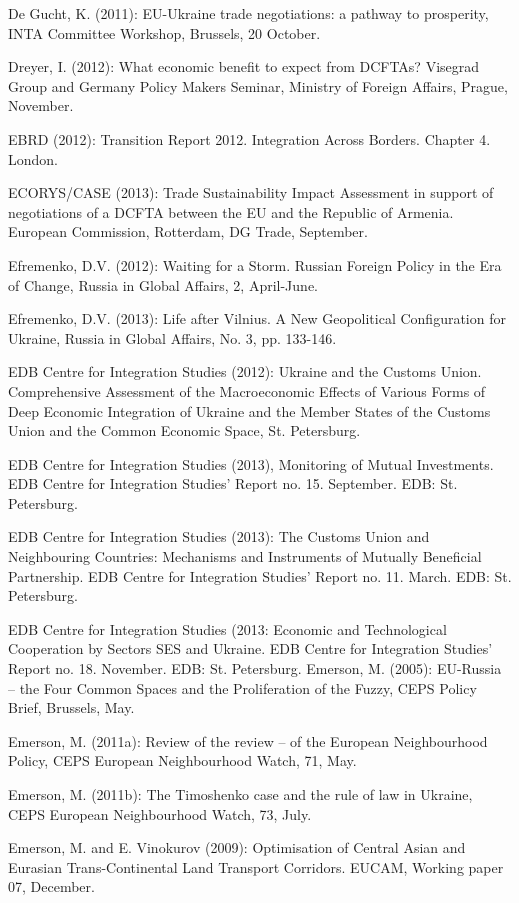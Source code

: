 De Gucht, K. (2011): EU-Ukraine trade negotiations: a pathway to prosperity, INTA Committee Workshop, Brussels, 20 October.

Dreyer, I. (2012): What economic benefit to expect from DCFTAs? Visegrad Group and Germany Policy Makers Seminar, Ministry of Foreign Affairs, Prague, November.

EBRD (2012): Transition Report 2012. Integration Across Borders. Chapter 4. London.

ECORYS/CASE (2013): Trade Sustainability Impact Assessment in support of negotiations of a DCFTA between the EU and the Republic of Armenia. European Commission, Rotterdam, DG Trade, September.

Efremenko, D.V. (2012): Waiting for a Storm. Russian Foreign Policy in the Era of Change, Russia in Global Affairs, 2, April-June.

Efremenko, D.V. (2013): Life after Vilnius. A New Geopolitical Configuration for Ukraine, Russia in Global Affairs, No. 3, pp. 133-146. 

EDB Centre for Integration Studies (2012): Ukraine and the Customs Union. Comprehensive Assessment of the Macroeconomic Effects of Various Forms of Deep Economic Integration of Ukraine and the Member States of the Customs Union and the Common Economic Space, St. Petersburg. 

EDB Centre for Integration Studies (2013), Monitoring of Mutual Investments. EDB Centre for Integration Studies' Report no. 15. September. EDB: St. Petersburg.

EDB Centre for Integration Studies (2013): The Customs Union and Neighbouring Countries: Mechanisms and Instruments of Mutually Beneficial Partnership. EDB Centre for Integration Studies' Report no. 11. March. EDB: St. Petersburg.

EDB Centre for Integration Studies (2013: Economic and Technological Cooperation by Sectors SES and Ukraine. EDB Centre for Integration Studies' Report no. 18. November. EDB: St. Petersburg. Emerson, M. (2005): EU-Russia -- the Four Common Spaces and the Proliferation of the Fuzzy, CEPS Policy Brief, Brussels, May.

Emerson, M. (2011a): Review of the review -- of the European Neighbourhood Policy, CEPS European Neighbourhood Watch, 71, May.

Emerson, M. (2011b): The Timoshenko case and the rule of law in Ukraine, CEPS European Neighbourhood Watch, 73, July.

Emerson, M. and E. Vinokurov (2009): Optimisation of Central Asian and Eurasian Trans-Continental Land Transport Corridors. EUCAM, Working paper 07, December.


